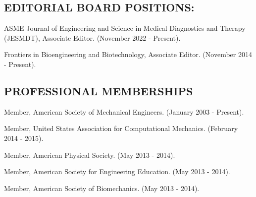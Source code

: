 \documentclass[11pt]{article}
\begin{document}
\subsection{EDITORIAL BOARD POSITIONS:}\label{editorial-board-positions}

ASME Journal of Engineering and Science in Medical Diagnostics and
Therapy (JESMDT), Associate Editor. 
(November 2022 - Present).

Frontiers in Bioengineering and Biotechnology, Associate Editor.
(November 2014 - Present).

\subsection{PROFESSIONAL MEMBERSHIPS}\label{professional-memberships}

Member, American Society of Mechanical Engineers. 
(January 2003 -
Present).

Member, United States Association for Computational Mechanics. 
(February
2014 - 2015).

Member, American Physical Society. 
(May 2013 - 2014).

Member, American Society for Engineering Education. 
(May 2013 - 2014).

Member, American Society of Biomechanics. 
(May 2013 - 2014).
\end{document}
